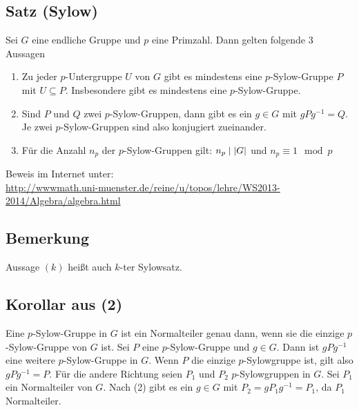 \subsection{Satz (Sylow)} %
\label{sub:44}
Sei $G$ eine endliche Gruppe und $p$ eine Primzahl. Dann gelten folgende 3 Aussagen
\begin{enumerate}[(1)]
	\item Zu jeder $p$-Untergruppe $U$ von $G$ gibt es mindestens eine $p$-Sylow-Gruppe $P$ mit $U \subseteq P$. Insbesondere gibt es mindestens eine $p$-Sylow-Gruppe.
	\item Sind $P$ und $Q$ zwei $p$-Sylow-Gruppen, dann gibt es ein $g \in G$ mit $g P g ^{-1} =Q$. Je zwei $p$-Sylow-Gruppen sind also konjugiert zueinander.
	\item Für die Anzahl $n_p$ der $p$-Sylow-Gruppen gilt: $n_p \mid \abs*{G} $ und $n_p \equiv 1 \mod p$
\end{enumerate}
Beweis im Internet unter: \\ {\footnotesize\url{http://wwwmath.uni-muenster.de/reine/u/topos/lehre/WS2013-2014/Algebra/algebra.html}}

\subsection[Bemerkung zur Bezeichnung der Sylow-Sätze]{Bemerkung} %
\label{sub:45}
Aussage $(k)$ heißt auch $k$-ter Sylowsatz.

\subsection[Korollar: Eine $p$-Sylowgruppen ist Normalteiler gdw. sie die einzige $p$-Sylowgruppe ist]{Korollar aus (2)} %
\label{sub:46}
Eine $p$-Sylow-Gruppe in $G$ ist ein Normalteiler genau dann, wenn sie die einzige $p$-Sylow-Gruppe von $G$ ist.
Sei $P$ eine $p$-Sylow-Gruppe und $g \in G$. Dann ist $g P g ^{-1}$ eine weitere $p$-Sylow-Gruppe in $G$. Wenn $P$ die einzige $p$-Sylowgruppe ist, gilt also $gP g ^{-1}=P$.
Für die andere Richtung seien $P_1$ und $P_2$ $p$-Sylowgruppen in $G$. Sei $P_1$ ein Normalteiler von $G$. Nach (2) gibt es ein $g \in G$ mit $P_2 = g P_1 g ^{-1} = P_1$, 
da $P_1$ Normalteiler. \bewende 

